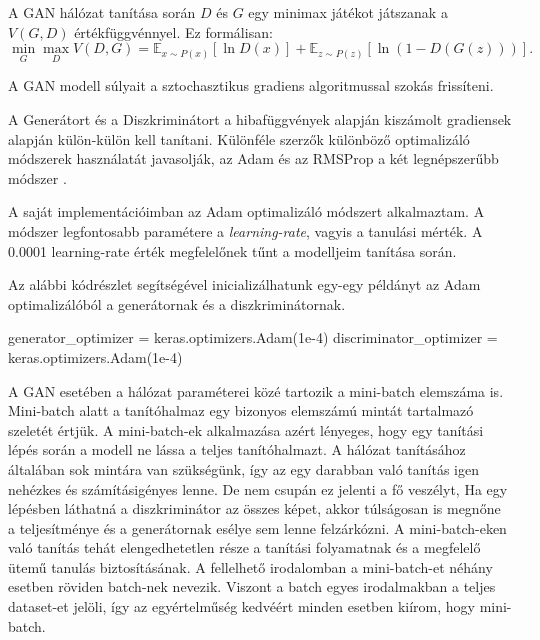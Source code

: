 A GAN hálózat tanítása során $D$ és $G$ egy minimax játékot játszanak a $V(G, D)$ értékfüggvénnyel. Ez formálisan:
$$\min_{G}\max_{D}V(D, G) =  \mathbb{E}_{x \sim P(x)} \left[\ln D(x) \right] + \mathbb{E}_{z \sim P(z)} \left[\ln(1 - D(G(z))) \right].$$

A GAN modell súlyait a sztochasztikus gradiens algoritmussal szokás frissíteni.

A Generátort és a Diszkriminátort a hibafüggvények alapján kiszámolt gradiensek alapján külön-külön kell tanítani. Különféle szerzők különböző optimalizáló módszerek használatát javasolják, az Adam és az RMSProp a két legnépszerűbb módszer \cite{kingma2014adam}.

A saját implementációimban az Adam optimalizáló módszert alkalmaztam. A módszer legfontosabb paramétere a \textit{learning-rate}, vagyis a tanulási mérték. A 0.0001 learning-rate érték megfelelőnek tűnt a modelljeim tanítása során.

Az alábbi kódrészlet segítségével inicializálhatunk egy-egy példányt az Adam optimalizálóból a generátornak és a diszkriminátornak.

\begin{python}
generator_optimizer = keras.optimizers.Adam(1e-4)
discriminator_optimizer = keras.optimizers.Adam(1e-4)
\end{python}


A GAN esetében a hálózat paraméterei közé tartozik a mini-batch elemszáma is. Mini-batch alatt a tanítóhalmaz egy bizonyos elemszámú mintát tartalmazó szeletét értjük. A mini-batch-ek alkalmazása azért lényeges, hogy egy tanítási lépés során a modell ne lássa a teljes tanítóhalmazt. A hálózat tanításához általában sok mintára van szükségünk, így az egy darabban való tanítás igen nehézkes és számításigényes lenne. De nem csupán ez jelenti a fő veszélyt, Ha egy lépésben láthatná a diszkriminátor az összes képet, akkor túlságosan is megnőne a teljesítménye és a generátornak esélye sem lenne felzárkózni. A mini-batch-eken való tanítás tehát elengedhetetlen része a tanítási folyamatnak és a megfelelő ütemű tanulás biztosításának.
A fellelhető irodalomban a mini-batch-et néhány esetben röviden batch-nek nevezik. Viszont a batch egyes irodalmakban a teljes dataset-et jelöli, így az egyértelműség kedvéért minden esetben kiírom, hogy mini-batch.


